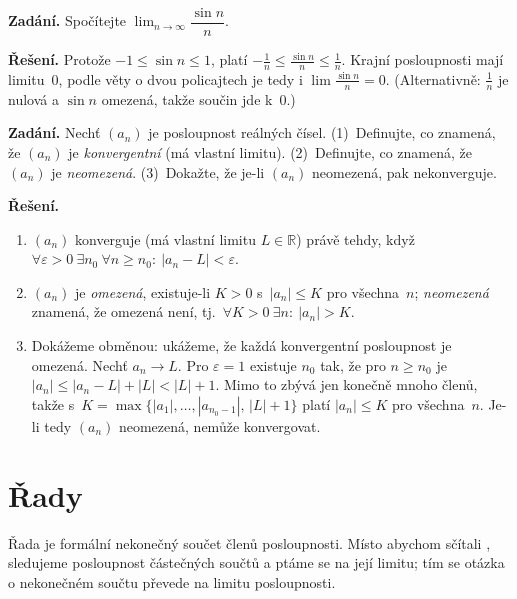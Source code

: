 \documentclass[11pt,a4paper]{article}
\begin{document}
\begin{priklad}
\textbf{Zadání.} Spočítejte $\lim_{n\to\infty}\dfrac{\sin n}{n}$.\par
\textbf{Řešení.} Protože $-1\le\sin n\le 1$, platí $-\tfrac1n\le\tfrac{\sin n}{n}\le\tfrac1n$. Krajní posloupnosti mají limitu~$0$, podle věty o dvou policajtech je tedy i $\lim\tfrac{\sin n}{n}=0$. (Alternativně: $\tfrac1n$ je nulová a $\sin n$ omezená, takže součin jde k~0.)
\end{priklad}

\begin{priklad} \par
\textbf{Zadání.} Nechť $(a_n)$ je posloupnost reálných čísel. (1)~Definujte, co znamená, že $(a_n)$ je \emph{konvergentní} (má vlastní limitu). (2)~Definujte, co znamená, že $(a_n)$ je \emph{neomezená}. (3)~Dokažte, že je-li $(a_n)$ neomezená, pak nekonverguje.\par
\textbf{Řešení.}
\begin{enumerate}
  \item $(a_n)$ konverguje (má vlastní limitu $L\in\mathbb{R}$) právě tehdy, když $\forall\varepsilon>0\ \exists n_0\ \forall n\ge n_0:\ |a_n-L|<\varepsilon$.
  \item $(a_n)$ je \emph{omezená}, existuje-li $K>0$ s~$|a_n|\le K$ pro všechna~$n$; \emph{neomezená} znamená, že omezená není, tj.\ $\forall K>0\ \exists n:\ |a_n|>K$.
  \item Dokážeme obměnou: ukážeme, že každá konvergentní posloupnost je omezená. Nechť $a_n\to L$. Pro $\varepsilon=1$ existuje $n_0$ tak, že pro $n\ge n_0$ je $|a_n|\le|a_n-L|+|L|<|L|+1$. Mimo to zbývá jen konečně mnoho členů, takže s~$K=\max\{|a_1|,\dots,|a_{n_0-1}|,\,|L|+1\}$ platí $|a_n|\le K$ pro všechna~$n$. Je-li tedy $(a_n)$ neomezená, nemůže konvergovat.
\end{enumerate}
\end{priklad}

\section{Řady}

Řada je formální nekonečný součet členů posloupnosti. Místo abychom sčítali , sledujeme posloupnost částečných součtů a ptáme se na její limitu; tím se otázka o nekonečném součtu převede na limitu posloupnosti.
\end{document}
